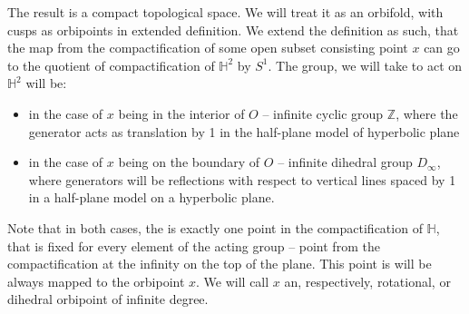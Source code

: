 The result is a compact topological space. We will treat it as an orbifold, with 
cusps as orbipoints in extended definition. 
We extend the definition as such, that the map from the compactification of 
some open subset consisting point $x$ can go to the quotient of compactification of 
$\mathbb{H}^2$ by $S^1$. The group, we will take to act on $\mathbb{H}^2$ will 
be:
\begin{itemize} 
\item in the case of $x$ being in the interior of $O$ -- infinite cyclic group $\mathbb{Z}$, 
where the generator acts as translation by 1 
in the half-plane model of hyperbolic plane   
\item in the case of $x$ being on the boundary of $O$ -- infinite dihedral group $D_\infty$, where 
generators will be reflections with respect to vertical lines spaced by 1 in a half-plane 
model on a hyperbolic plane.
\end{itemize}

Note that in both cases, the is exactly one point in the compactification of $\mathbb{H}$, that is 
fixed for every element of the acting group -- point from the compactification at 
the infinity on the top of the plane. This point is will be always mapped to the orbipoint $x$. 
We will call $x$ an, respectively, rotational, or dihedral orbipoint of infinite degree.



